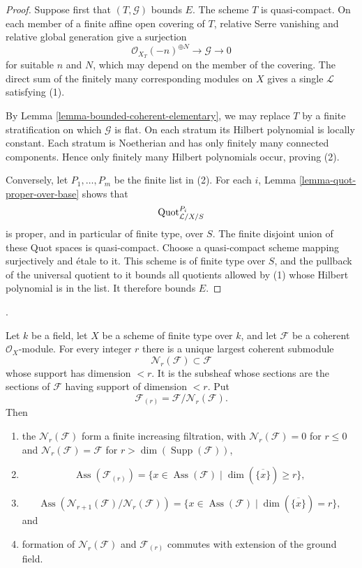 \begin{proof}
Suppose first that $(T,\mathcal{G})$ bounds $E$. The scheme $T$ is
quasi-compact. On each member of a finite affine open covering of $T$,
relative Serre vanishing and relative global generation give a surjection
$$
\mathcal{O}_{X_T}(-n)^{\oplus N} \longrightarrow \mathcal{G}
\longrightarrow 0
$$
for suitable $n$ and $N$, which may depend on the member of the covering.
The direct sum of the finitely many corresponding modules on $X$ gives a
single $\mathcal{L}$ satisfying (1).

By Lemma \ref{lemma-bounded-coherent-elementary}, we may replace $T$ by a
finite stratification on which $\mathcal{G}$ is flat. On each stratum its
Hilbert polynomial is locally constant. Each stratum is Noetherian and has
only finitely many connected components. Hence only finitely many Hilbert
polynomials occur, proving (2).

Conversely, let $P_1,\ldots,P_m$ be the finite list in (2). For each $i$,
Lemma \ref{lemma-quot-proper-over-base} shows that
$$
\mathrm{Quot}^{P_i}_{\mathcal{L}/X/S}
$$
is proper, and in particular of finite type, over $S$. The finite disjoint
union of these Quot spaces is quasi-compact. Choose a quasi-compact scheme
mapping surjectively and \'etale to it. This scheme is of finite type over
$S$, and the pullback of the universal quotient to it bounds all quotients
allowed by (1) whose Hilbert polynomial is in the list. It therefore bounds
$E$.
\end{proof}


\begin{lemma}
\label{lemma-coherent-dimension-truncation}
\begin{reference}
\cite[Expos\'e 221, the paragraph preceding Theorem 2.2,
pp. 254--255]{FGA}.
\end{reference}
Let $k$ be a field, let $X$ be a scheme of finite type over $k$, and let
$\mathcal{F}$ be a coherent $\mathcal{O}_X$-module. For every integer $r$
there is a unique largest coherent submodule
$$
\mathcal{N}_r(\mathcal{F}) \subset \mathcal{F}
$$
whose support has dimension $< r$. It is the subsheaf whose sections are the
sections of $\mathcal{F}$ having support of dimension $< r$. Put
$$
\mathcal{F}_{(r)} = \mathcal{F}/\mathcal{N}_r(\mathcal{F}).
$$
Then
\begin{enumerate}
\item the $\mathcal{N}_r(\mathcal{F})$ form a finite increasing filtration,
with $\mathcal{N}_r(\mathcal{F})=0$ for $r \leq 0$ and
$\mathcal{N}_r(\mathcal{F})=\mathcal{F}$ for
$r>\dim(\operatorname{Supp}(\mathcal{F}))$,
\item
$$
\operatorname{Ass}(\mathcal{F}_{(r)})=
\{x\in\operatorname{Ass}(\mathcal{F})\mid
\dim(\overline{\{x\}})\geq r\},
$$
\item
$$
\operatorname{Ass}(\mathcal{N}_{r+1}(\mathcal{F})/
\mathcal{N}_r(\mathcal{F}))=
\{x\in\operatorname{Ass}(\mathcal{F})\mid
\dim(\overline{\{x\}})=r\},
$$
and
\item formation of $\mathcal{N}_r(\mathcal{F})$ and
$\mathcal{F}_{(r)}$ commutes with extension of the ground field.
\end{enumerate}
\end{lemma}

